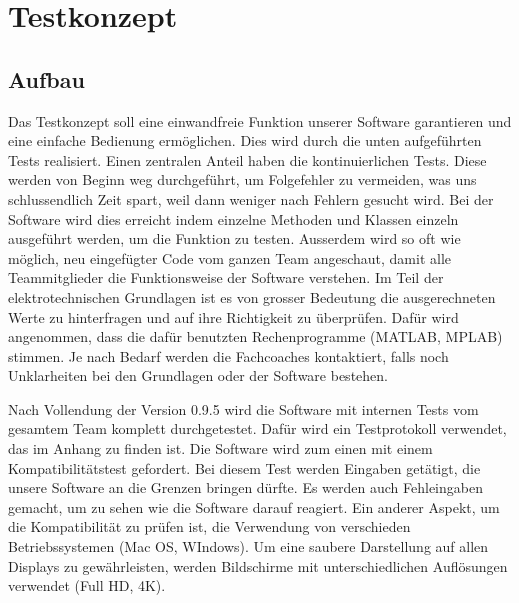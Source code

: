 \section{Testkonzept}\label{sec:testkonzept}

\subsection{Aufbau} \label{subsec:prinzip}

Das Testkonzept soll eine einwandfreie Funktion unserer Software garantieren und eine einfache Bedienung ermöglichen. Dies wird durch die unten aufgeführten Tests realisiert. 
Einen zentralen Anteil haben die kontinuierlichen Tests. Diese werden von Beginn weg durchgeführt, um Folgefehler zu vermeiden, was uns schlussendlich Zeit spart, weil dann weniger nach Fehlern gesucht wird.  
Bei der Software wird dies erreicht indem einzelne Methoden und Klassen einzeln ausgeführt werden, um die Funktion zu testen. Ausserdem wird so oft wie möglich, neu eingefügter Code vom ganzen Team angeschaut, damit alle Teammitglieder die Funktionsweise der Software verstehen.
Im Teil der elektrotechnischen Grundlagen ist es von grosser Bedeutung die ausgerechneten Werte zu hinterfragen und auf ihre Richtigkeit zu überprüfen. Dafür wird angenommen, dass die dafür benutzten Rechenprogramme (MATLAB, MPLAB) stimmen. 
Je nach Bedarf werden die Fachcoaches kontaktiert, falls noch Unklarheiten bei den Grundlagen oder der Software bestehen. 

Nach Vollendung der Version 0.9.5 wird die Software mit internen Tests vom gesamtem Team komplett durchgetestet. Dafür wird ein Testprotokoll verwendet, das  im Anhang zu finden ist.  
Die Software wird zum einen mit einem Kompatibilitätstest gefordert. Bei diesem Test werden Eingaben getätigt, die unsere Software an die Grenzen bringen dürfte. Es werden auch Fehleingaben gemacht, um zu sehen wie die Software darauf reagiert. Ein anderer Aspekt, um die Kompatibilität zu prüfen ist, die Verwendung von verschieden Betriebssystemen (Mac OS, WIndows). Um eine saubere Darstellung auf allen Displays zu gewährleisten, werden Bildschirme mit unterschiedlichen Auflösungen verwendet (Full HD, 4K).

